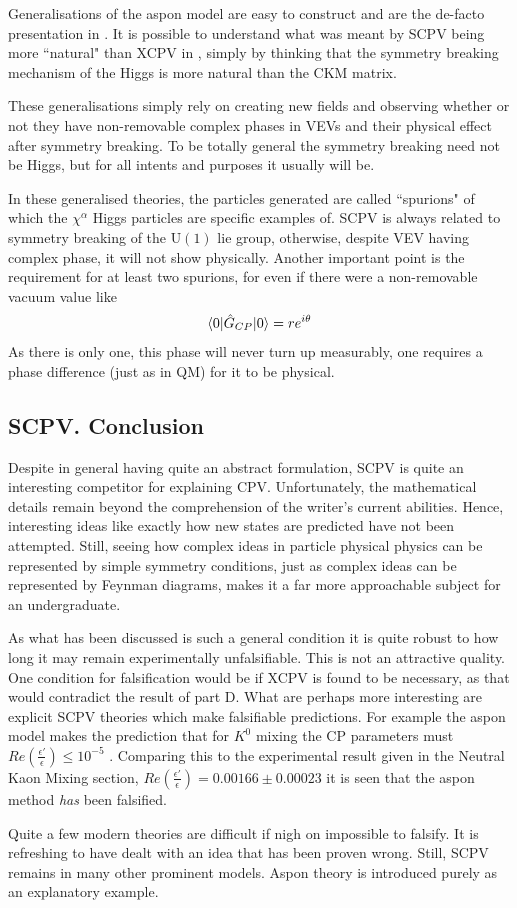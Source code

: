 \documentclass[floatfix,aps,prd,amsmath,amssymb]{revtex4}
\begin{document}
Generalisations of the aspon model are easy to construct and are the de-facto presentation in \cite{SCPV5}. It is possible to understand what was meant by SCPV being more ``natural" than XCPV in \cite{SCPV1}, simply by thinking that the symmetry breaking mechanism of the Higgs is more natural than the CKM matrix. 


These generalisations simply rely on creating new fields and observing whether or not they have non-removable complex phases in VEVs and their physical effect after symmetry breaking. To be totally general the symmetry breaking need not be Higgs, but for all intents and purposes it usually will be.

In these generalised theories, the particles generated are called ``spurions" of which the $\chi^\alpha$ Higgs particles are specific examples of. SCPV is always related to symmetry breaking of the $\mathrm{U}(1)$ lie group, otherwise, despite VEV having complex phase, it will not show physically. Another important point is the requirement for at least two spurions, for even if there were a non-removable vacuum value like
\begin{align*}
\braket{0|\hat{G}_{CP}|0} = r e^{i\theta}
\end{align*}
As there is only one, this phase will never turn up measurably, one requires a phase difference (just as in QM) for it to be physical.

\subsection{SCPV. Conclusion}
Despite in general having quite an abstract formulation, SCPV is quite an interesting competitor for explaining CPV. Unfortunately, the mathematical details remain beyond the comprehension of the writer's current abilities. Hence, interesting ideas like exactly how new states are predicted have not been attempted. Still, seeing how complex ideas in particle physical physics can be represented by simple symmetry conditions, just as complex ideas can be represented by Feynman diagrams, makes it a far more approachable subject for an undergraduate.

As what has been discussed is such a general condition it is quite robust to how long it may remain experimentally unfalsifiable. This is not an attractive quality. One condition for falsification would be if XCPV is found to be necessary, as that would contradict the result of part D. What are perhaps more interesting are explicit SCPV theories which make falsifiable predictions. For example the aspon model makes the prediction that for $K^0$ mixing the CP parameters must $Re(\frac{\epsilon'}{\epsilon}) \leq 10^{-5}$ \cite{SCPV7}. Comparing this to the experimental result given in the Neutral Kaon Mixing section, $Re(\frac{\epsilon'}{\epsilon})=0.00166 \pm 0.00023$ it is seen that the aspon method \textit{has} been falsified. 

Quite a few modern theories are difficult if nigh on impossible to falsify. It is refreshing to have dealt with an idea that has been proven wrong. Still, SCPV remains in many other prominent models. Aspon theory is introduced purely as an explanatory example.
\end{document}
